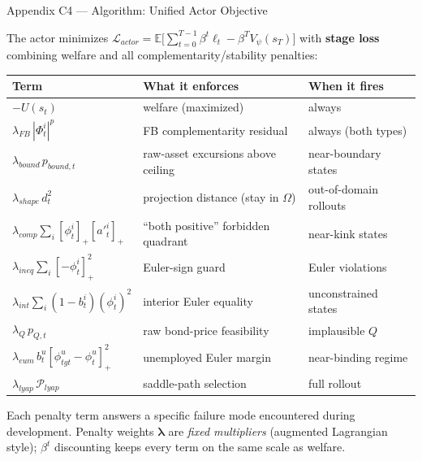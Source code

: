 \documentclass[10pt,aspectratio=169]{beamer}
\newcommand{\compacttables}{\renewcommand{\arraystretch}{1.15}}
\begin{document}
\begin{frame}[label=appStack]{Appendix C4 --- Algorithm: Unified Actor Objective}
\hfill\hyperlink{mainFinalAlgo}{}
\vspace{0.2em}

The actor minimizes $\mathcal{L}_{actor}=\mathbb{E}\big[\sum_{t=0}^{T-1}\beta^t\ell_t-\beta^T V_\psi(s_T)\big]$
with \textbf{stage loss} combining welfare and all complementarity/stability penalties:

\smallskip
\compacttables\footnotesize
\renewcommand{\arraystretch}{1.1}
\begin{tabular}{p{2.5cm}p{4.8cm}p{4.5cm}}
\toprule
\textbf{Term} & \textbf{What it enforces} & \textbf{When it fires} \\
\midrule
$-U(s_t)$ & welfare (maximized) & always \\
$\lambda_{FB}\,|\Phi^i_t|^p$ & FB complementarity residual & always (both types) \\
$\lambda_{bound}\,p_{bound,t}$ & raw-asset excursions above ceiling & near-boundary states \\
$\lambda_{shape}\,d_t^2$ & projection distance (stay in $\Omega$) & out-of-domain rollouts \\
$\lambda_{comp}\sum_i[\phi^i_t]_+[a'^i_t]_+$ & ``both positive'' forbidden quadrant & near-kink states \\
$\lambda_{ineq}\sum_i[-\phi^i_t]_+^2$ & Euler-sign guard & Euler violations \\
$\lambda_{int}\sum_i(1-b^i_t)(\phi^i_t)^2$ & interior Euler equality & unconstrained states \\
$\lambda_Q\,p_{Q,t}$ & raw bond-price feasibility & implausible $Q$ \\
$\lambda_{eum}\,b^u_t[\phi^u_{tgt}-\phi^u_t]_+^2$ & unemployed Euler margin & near-binding regime \\
$\lambda_{lyap}\,\mathcal{P}_{lyap}$ & saddle-path selection & full rollout \\
\bottomrule
\end{tabular}

\smallskip
{\small Each penalty term answers a specific failure mode encountered during development.
Penalty weights $\boldsymbol\lambda$ are \emph{fixed multipliers} (augmented Lagrangian style);
$\beta^t$ discounting keeps every term on the same scale as welfare.}
\end{frame}
\end{document}
